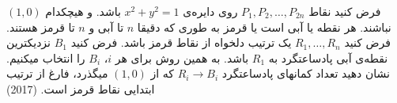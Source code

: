 فرض کنید نقاط $P_1, P_2, \dots, P_{2n}$ روی دایره‌ی $x^2 + y^2 = 1$ باشد. 
و هیچکدام $(1, 0)$ نباشند.
هر نقطه یا آبی است یا قرمز به طوری که دقیقا $n$ تا آبی و $n$ تا قرمز هستند.
فرض کنید $R_1, \dots, R_n$ یک ترتیب دلخواه از نقاط قرمز باشد.
فرض کنید $B_1$ نزدیکترین نقطه‌‌ی آبی پادساعتگرد به $R_1$ باشد.
به همین روش برای هر $i$، $B_i$ را انتخاب میکنیم.
نشان دهید تعداد کمانهای پادساعتگرد $R_i \to B_i$ که از $(1, 0)$ میگذرد، فارغ از ترتیب ابتدایی نقاط قرمز است.
(2017)